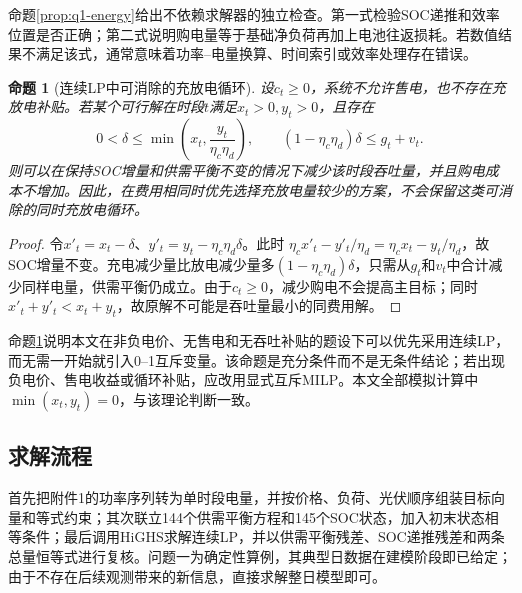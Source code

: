 \documentclass[UTF8,12pt,a4paper]{ctexart}
\newtheorem{proposition}{命题}[section]
\theoremstyle{remark}
\begin{document}
命题\ref{prop:q1-energy}给出不依赖求解器的独立检查。第一式检验SOC递推和效率位置是否正确；第二式说明购电量等于基础净负荷再加上电池往返损耗。若数值结果不满足该式，通常意味着功率--电量换算、时间索引或效率处理存在错误。

\begin{proposition}[连续LP中可消除的充放电循环]\label{prop:no-cycle}
设$c_t\ge0$，系统不允许售电，也不存在充放电补贴。若某个可行解在时段$t$满足$x_t>0,y_t>0$，且存在
\[
0<\delta\le\min\!\left(x_t,\frac{y_t}{\eta_c\eta_d}\right),\qquad
(1-\eta_c\eta_d)\delta\le g_t+v_t.
\]
则可以在保持SOC增量和供需平衡不变的情况下减少该时段吞吐量，并且购电成本不增加。因此，在费用相同时优先选择充放电量较少的方案，不会保留这类可消除的同时充放电循环。
\end{proposition}
\begin{proof}
令$x'_t=x_t-\delta$、$y'_t=y_t-\eta_c\eta_d\delta$。此时
$\eta_cx'_t-y'_t/\eta_d=\eta_cx_t-y_t/\eta_d$，故SOC增量不变。充电减少量比放电减少量多$(1-\eta_c\eta_d)\delta$，只需从$g_t$和$v_t$中合计减少同样电量，供需平衡仍成立。由于$c_t\ge0$，减少购电不会提高主目标；同时$x'_t+y'_t<x_t+y_t$，故原解不可能是吞吐量最小的同费用解。
\end{proof}

命题\ref{prop:no-cycle}说明本文在非负电价、无售电和无吞吐补贴的题设下可以优先采用连续LP，而无需一开始就引入0--1互斥变量。该命题是充分条件而不是无条件结论；若出现负电价、售电收益或循环补贴，应改用显式互斥MILP。本文全部模拟计算中$\min(x_t,y_t)=0$，与该理论判断一致。

\subsection{求解流程}
首先把附件1的功率序列转为单时段电量，并按价格、负荷、光伏顺序组装目标向量和等式约束；其次联立144个供需平衡方程和145个SOC状态，加入初末状态相等条件；最后调用HiGHS求解连续LP，并以供需平衡残差、SOC递推残差和两条总量恒等式进行复核。问题一为确定性算例，其典型日数据在建模阶段即已给定；由于不存在后续观测带来的新信息，直接求解整日模型即可。
\end{document}
